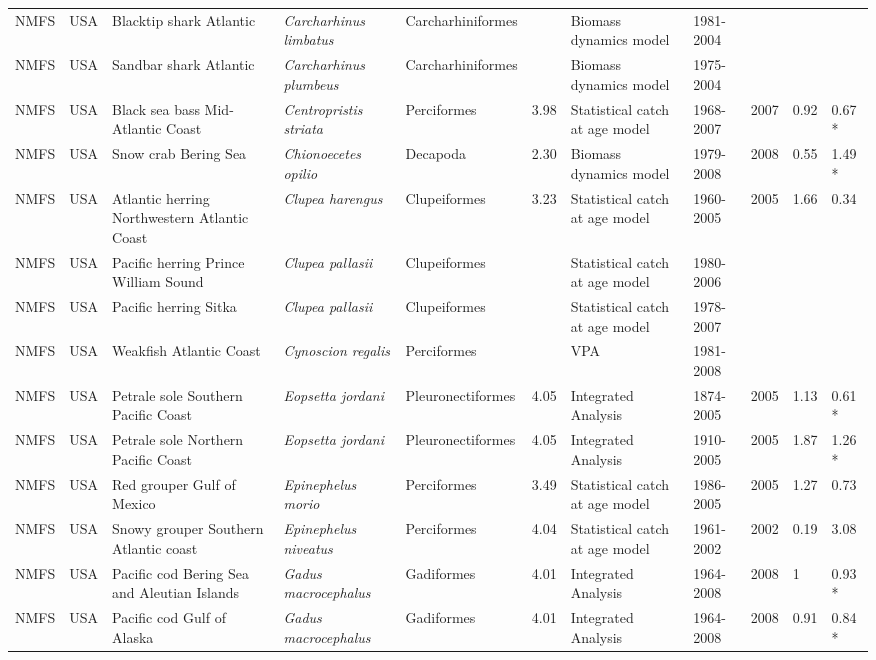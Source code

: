 \begin{longtable}{p{1.5cm}p{1.5cm}p{3cm}p{3cm}p{2.5cm}p{0.9cm}p{1.4cm}p{0.9cm}p{0.9cm}p{0.9cm}p{1cm}}
  NMFS & USA & Blacktip shark Atlantic & \textit{Carcharhinus limbatus} & Carcharhiniformes &  & Biomass dynamics model & 1981-2004 &  &  &  \\ 
  NMFS & USA & Sandbar shark Atlantic & \textit{Carcharhinus plumbeus} & Carcharhiniformes &  & Biomass dynamics model & 1975-2004 &  &  &  \\ 
  NMFS & USA & Black sea bass Mid-Atlantic Coast & \textit{Centropristis striata} & Perciformes & 3.98 & Statistical catch at age model & 1968-2007 & 2007 & 0.92 & 0.67 * \\ 
  NMFS & USA & Snow crab Bering Sea & \textit{Chionoecetes opilio} & Decapoda & 2.30 & Biomass dynamics model & 1979-2008 & 2008 & 0.55 & 1.49 * \\ 
  NMFS & USA & Atlantic herring Northwestern Atlantic Coast & \textit{Clupea harengus} & Clupeiformes & 3.23 & Statistical catch at age model & 1960-2005 & 2005 & 1.66 & 0.34 \\ 
  NMFS & USA & Pacific herring Prince William Sound & \textit{Clupea pallasii} & Clupeiformes &  & Statistical catch at age model & 1980-2006 &  &  &  \\ 
  NMFS & USA & Pacific herring Sitka & \textit{Clupea pallasii} & Clupeiformes &  & Statistical catch at age model & 1978-2007 &  &  &  \\ 
  NMFS & USA & Weakfish Atlantic Coast & \textit{Cynoscion regalis} & Perciformes &  & VPA & 1981-2008 &  &  &  \\ 
  NMFS & USA & Petrale sole Southern Pacific Coast & \textit{Eopsetta jordani} & Pleuronectiformes & 4.05 & Integrated Analysis & 1874-2005 & 2005 & 1.13 & 0.61 * \\ 
  NMFS & USA & Petrale sole Northern Pacific Coast & \textit{Eopsetta jordani} & Pleuronectiformes & 4.05 & Integrated Analysis & 1910-2005 & 2005 & 1.87 & 1.26 * \\ 
  NMFS & USA & Red grouper Gulf of Mexico & \textit{Epinephelus morio} & Perciformes & 3.49 & Statistical catch at age model & 1986-2005 & 2005 & 1.27 & 0.73 \\ 
  NMFS & USA & Snowy grouper Southern Atlantic coast & \textit{Epinephelus niveatus} & Perciformes & 4.04 & Statistical catch at age model & 1961-2002 & 2002 & 0.19 & 3.08 \\ 
  NMFS & USA & Pacific cod Bering Sea and Aleutian Islands & \textit{Gadus macrocephalus} & Gadiformes & 4.01 & Integrated Analysis & 1964-2008 & 2008 & 1 & 0.93 * \\ 
  NMFS & USA & Pacific cod Gulf of Alaska & \textit{Gadus macrocephalus} & Gadiformes & 4.01 & Integrated Analysis & 1964-2008 & 2008 & 0.91 & 0.84 * \\ 

\end{longtable}
